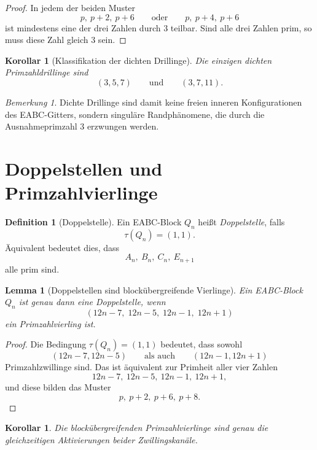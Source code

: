 \documentclass[11pt,a4paper]{article}
\newtheorem{lemma}[theorem]{Lemma}
\newtheorem{corollary}[theorem]{Korollar}
\theoremstyle{definition}
\newtheorem{definition}[theorem]{Definition}
\theoremstyle{remark}
\newtheorem{remark}[theorem]{Bemerkung}
\begin{document}
	\begin{proof}
		In jedem der beiden Muster
		\[
		p,\ p+2,\ p+6
		\qquad\text{oder}\qquad
		p,\ p+4,\ p+6
		\]
		ist mindestens eine der drei Zahlen durch \(3\) teilbar. Sind alle drei Zahlen prim, so muss diese Zahl gleich \(3\) sein.
	\end{proof}
	
	\begin{corollary}[Klassifikation der dichten Drillinge]
		Die einzigen dichten Primzahldrillinge sind
		\[
		(3,5,7)
		\qquad\text{und}\qquad
		(3,7,11).
		\]
	\end{corollary}
	
	\begin{remark}
		Dichte Drillinge sind damit keine freien inneren Konfigurationen des EABC-Gitters, sondern singuläre Randphänomene, die durch die Ausnahmeprimzahl \(3\) erzwungen werden.
	\end{remark}
	
	\section{Doppelstellen und Primzahlvierlinge}
	
	\begin{definition}[Doppelstelle]
		Ein EABC-Block \(Q_n\) heißt \emph{Doppelstelle}, falls
		\[
		\tau(Q_n)=(1,1).
		\]
		Äquivalent bedeutet dies, dass
		\[
		A_n,\ B_n,\ C_n,\ E_{n+1}
		\]
		alle prim sind.
	\end{definition}
	
	\begin{lemma}[Doppelstellen sind blockübergreifende Vierlinge]
		Ein EABC-Block \(Q_n\) ist genau dann eine Doppelstelle, wenn
		\[
		(12n-7,\;12n-5,\;12n-1,\;12n+1)
		\]
		ein Primzahlvierling ist.
	\end{lemma}
	
	\begin{proof}
		Die Bedingung \(\tau(Q_n)=(1,1)\) bedeutet, dass sowohl
		\[
		(12n-7,12n-5)
		\qquad\text{als auch}\qquad
		(12n-1,12n+1)
		\]
		Primzahlzwillinge sind.
		Das ist äquivalent zur Primheit aller vier Zahlen
		\[
		12n-7,\ 12n-5,\ 12n-1,\ 12n+1,
		\]
		und diese bilden das Muster
		\[
		p,\ p+2,\ p+6,\ p+8.
		\]
	\end{proof}
	
	\begin{corollary}
		Die blockübergreifenden Primzahlvierlinge sind genau die gleichzeitigen Aktivierungen beider Zwillingskanäle.
	\end{corollary}
	
\end{document}
